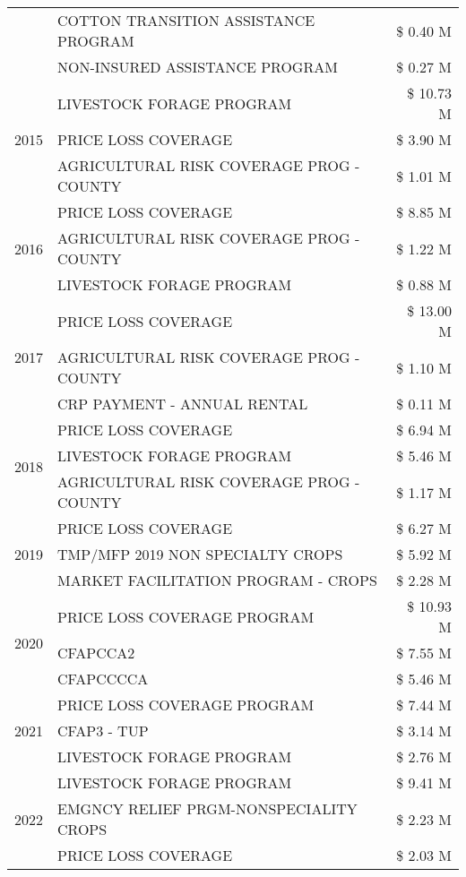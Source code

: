 \begin{tabular}{llr}
 & COTTON TRANSITION ASSISTANCE PROGRAM & \$ 0.40 M \\
 & NON-INSURED ASSISTANCE PROGRAM & \$ 0.27 M \\
\cline{1-3}
\multirow[t]{3}{*}{2015} & LIVESTOCK FORAGE PROGRAM & \$ 10.73 M \\
 & PRICE LOSS COVERAGE & \$ 3.90 M \\
 & AGRICULTURAL RISK COVERAGE PROG - COUNTY & \$ 1.01 M \\
\cline{1-3}
\multirow[t]{3}{*}{2016} & PRICE LOSS COVERAGE & \$ 8.85 M \\
 & AGRICULTURAL RISK COVERAGE PROG - COUNTY & \$ 1.22 M \\
 & LIVESTOCK FORAGE PROGRAM & \$ 0.88 M \\
\cline{1-3}
\multirow[t]{3}{*}{2017} & PRICE LOSS COVERAGE & \$ 13.00 M \\
 & AGRICULTURAL RISK COVERAGE PROG - COUNTY & \$ 1.10 M \\
 & CRP PAYMENT - ANNUAL RENTAL & \$ 0.11 M \\
\cline{1-3}
\multirow[t]{3}{*}{2018} & PRICE LOSS COVERAGE & \$ 6.94 M \\
 & LIVESTOCK FORAGE PROGRAM & \$ 5.46 M \\
 & AGRICULTURAL RISK COVERAGE PROG - COUNTY & \$ 1.17 M \\
\cline{1-3}
\multirow[t]{3}{*}{2019} & PRICE LOSS COVERAGE & \$ 6.27 M \\
 & TMP/MFP 2019 NON SPECIALTY CROPS & \$ 5.92 M \\
 & MARKET FACILITATION PROGRAM - CROPS & \$ 2.28 M \\
\cline{1-3}
\multirow[t]{3}{*}{2020} & PRICE LOSS COVERAGE PROGRAM & \$ 10.93 M \\
 & CFAPCCA2 & \$ 7.55 M \\
 & CFAPCCCCA & \$ 5.46 M \\
\cline{1-3}
\multirow[t]{3}{*}{2021} & PRICE LOSS COVERAGE PROGRAM & \$ 7.44 M \\
 & CFAP3 - TUP & \$ 3.14 M \\
 & LIVESTOCK FORAGE PROGRAM & \$ 2.76 M \\
\cline{1-3}
\multirow[t]{3}{*}{2022} & LIVESTOCK FORAGE PROGRAM & \$ 9.41 M \\
 & EMGNCY RELIEF PRGM-NONSPECIALITY CROPS & \$ 2.23 M \\
 & PRICE LOSS COVERAGE & \$ 2.03 M \\
\cline{1-3}
\bottomrule
\end{tabular}
